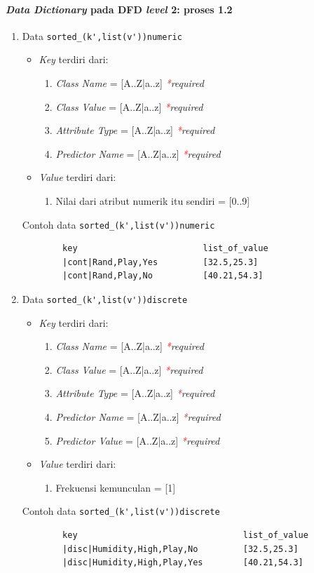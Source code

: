 \paragraph{\textit{Data Dictionary} pada DFD \textit{level} 2: proses 1.2}
\begin{enumerate}
	\item{Data \verb|sorted_(k',list(v'))numeric|}
	\begin{itemize}
		\item \textit{Key} terdiri dari:
		\begin{enumerate}
			\item \textit{Class Name} = [A..Z|a..z] \textit{\textcolor{red}{*}required}
			\item \textit{Class Value} = [A..Z|a..z] \textit{\textcolor{red}{*}required}
			\item \textit{Attribute Type} = [A..Z|a..z] \textit{\textcolor{red}{*}required}
			\item \textit{Predictor Name} = [A..Z|a..z] \textit{\textcolor{red}{*}required}
		\end{enumerate}
		\item \textit{Value} terdiri dari:
		\begin{enumerate}
			\item Nilai dari atribut numerik itu sendiri = [0..9]
		\end{enumerate}
	\end{itemize}
	Contoh data \verb|sorted_(k',list(v'))numeric|
	\begin{lstlisting}
		key							list_of_value
		|cont|Rand,Play,Yes			[32.5,25.3]
		|cont|Rand,Play,No			[40.21,54.3]
	\end{lstlisting}
	
	\item{Data \verb|sorted_(k',list(v'))discrete|}
	\begin{itemize}
		\item \textit{Key} terdiri dari:
		\begin{enumerate}
			\item \textit{Class Name} = [A..Z|a..z] \textit{\textcolor{red}{*}required}
			\item \textit{Class Value} = [A..Z|a..z] \textit{\textcolor{red}{*}required}
			\item \textit{Attribute Type} = [A..Z|a..z] \textit{\textcolor{red}{*}required}
			\item \textit{Predictor Name} = [A..Z|a..z] \textit{\textcolor{red}{*}required}
			\item \textit{Predictor Value} = [A..Z|a..z] \textit{\textcolor{red}{*}required}
		\end{enumerate}
		\item \textit{Value} terdiri dari:
		\begin{enumerate}
			\item Frekuensi kemunculan = [1]
		\end{enumerate}
	\end{itemize}
	Contoh data \verb|sorted_(k',list(v'))discrete|
	\begin{lstlisting}
		key									list_of_value
		|disc|Humidity,High,Play,No			[32.5,25.3]
		|disc|Humidity,High,Play,Yes		[40.21,54.3]
	\end{lstlisting}
	

\end{enumerate}
